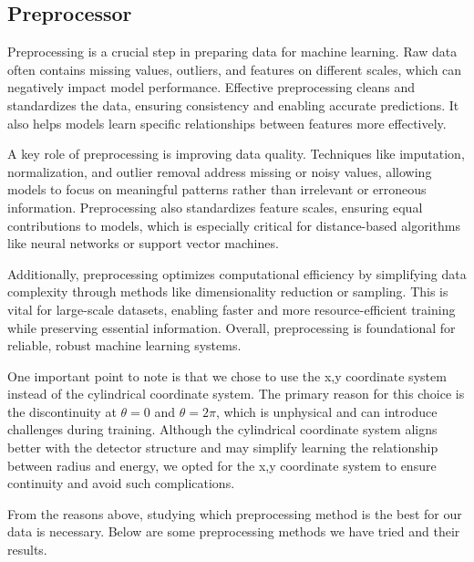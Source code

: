 \subsection{Preprocessor}

Preprocessing is a crucial step in preparing data for machine learning. Raw data often contains missing values, outliers, and features on different scales, which can negatively impact model performance. Effective preprocessing cleans and standardizes the data, ensuring consistency and enabling accurate predictions. It also helps models learn specific relationships between features more effectively.

A key role of preprocessing is improving data quality. Techniques like imputation, normalization, and outlier removal address missing or noisy values, allowing models to focus on meaningful patterns rather than irrelevant or erroneous information. Preprocessing also standardizes feature scales, ensuring equal contributions to models, which is especially critical for distance-based algorithms like neural networks or support vector machines.

Additionally, preprocessing optimizes computational efficiency by simplifying data complexity through methods like dimensionality reduction or sampling. This is vital for large-scale datasets, enabling faster and more resource-efficient training while preserving essential information. Overall, preprocessing is foundational for reliable, robust machine learning systems.

One important point to note is that we chose to use the x,y coordinate system instead of the cylindrical coordinate system. The primary reason for this choice is the discontinuity at $\theta=0$ and $\theta=2\pi$, which is unphysical and can introduce challenges during training. Although the cylindrical coordinate system aligns better with the detector structure and may simplify learning the relationship between radius and energy, we opted for the x,y coordinate system to ensure continuity and avoid such complications. 

From the reasons above, studying which preprocessing method is the best for our data is necessary. Below are some preprocessing methods we have tried and their results. 

